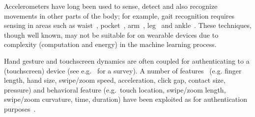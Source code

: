 Accelerometers have long been used to sense, detect and also recognize
movements in other parts of the body; for example, gait recognition requires
sensing in areas such as waist~\cite{ailisto2005identifying},
pocket~\cite{gafurov2007gait}, arm~\cite{okumura2006study,gafurov2008arm},
leg~\cite{gafurov2006biometric} and ankle~\cite{gafurov2011user}.
These techniques, though well known, may not be suitable for on wearable
devices due to complexity (computation and energy) in the machine learning
process.

Hand gesture and touchscreen dynamics are often coupled for
authenticating to a (touchscreen) device (see e.g.~\cite{gesturesoverview}
for a survey). A number of features~\cite{gesturesoverview,sae2012biometric} (e.g. finger length, hand size,
swipe/zoom speed, acceleration, click gap, contact size, pressure)
and behavioral feature (e.g.~touch location,
swipe/zoom length,
swipe/zoom curvature, time, duration) have been exploited as
for authentication purposes~\cite{gesturesoverview,sherman2014user,frank2013touchalytics,feng2014tips}.





